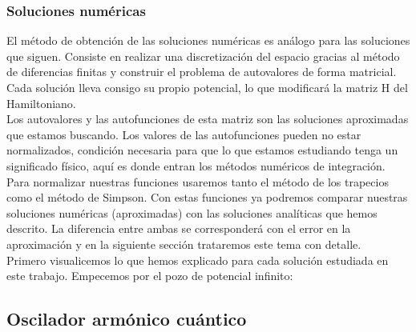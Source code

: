 \documentclass[12pt]{article}
\begin{document}
    \subsubsection{Soluciones numéricas}

    El método de obtención de las soluciones numéricas es análogo para las soluciones que siguen. Consiste en realizar una discretización del espacio gracias al método de diferencias finitas y construir el problema de autovalores de forma matricial. Cada solución lleva consigo su propio potencial, lo que modificará la matriz H del Hamiltoniano.\\

    Los autovalores y las autofunciones de esta matriz son las soluciones aproximadas que estamos buscando. Los valores de las autofunciones pueden no estar normalizados, condición necesaria para que lo que estamos estudiando tenga un significado físico, aquí es donde entran los métodos numéricos de integración.\\

    Para normalizar nuestras funciones usaremos tanto el método de los trapecios como el método de Simpson. Con estas funciones ya podremos comparar nuestras soluciones numéricas (aproximadas) con las soluciones analíticas que hemos descrito. La diferencia entre ambas se corresponderá con el error en la aproximación y en la siguiente sección trataremos este tema con detalle.\\
    
    Primero visualicemos lo que hemos explicado para cada solución estudiada en este trabajo. Empecemos por el pozo de potencial infinito:



































    \subsection{Oscilador armónico cuántico}
\end{document}

